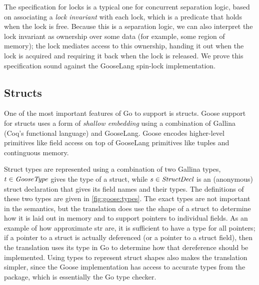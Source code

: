 The specification for locks is a typical one for concurrent separation logic,
based on associating a \emph{lock invariant} with each lock, which is a predicate that holds when the lock
is free. Because this is a separation logic, we can also interpret the lock
invariant as ownership over some data (for example, some region of memory); the
lock mediates access to this ownership, handing it out when the lock is acquired
and requiring it back when the lock is released. We prove this specification
sound against the GooseLang spin-lock implementation.

\subsection{Structs}


One of the most important features of Go to support is structs. Goose support
for structs uses a form of \emph{shallow embedding} using a combination of
Gallina (Coq's functional language) and GooseLang. Goose encodes
higher-level primitives like field access on top of GooseLang primitives like
tuples and continguous memory.

Struct types are represented using a combination of two Gallina types,
$t \in \textit{GooseType}$ gives the type of a struct, while
$s \in \textit{StructDecl}$ is an (anonymous) struct declaration that gives its
field names and their types. The definitions of these two types are given in
\cref{fig:goose:types}. The exact types are not important in the semantics,
but the translation does use the shape of a struct to determine how it is laid
out in memory and to support pointers to individual fields. As an example of how
approximate str are, it is sufficient to have a  type for
all pointers; if a pointer to a struct is actually deferenced (or a pointer to a
struct field), then the translation uses its type in Go to determine how that
dereference should be implemented. Using types to represent struct shapes
also makes the translation simpler, since the Goose implementation has
access to accurate types from the  package, which is essentially
the Go type checker.

